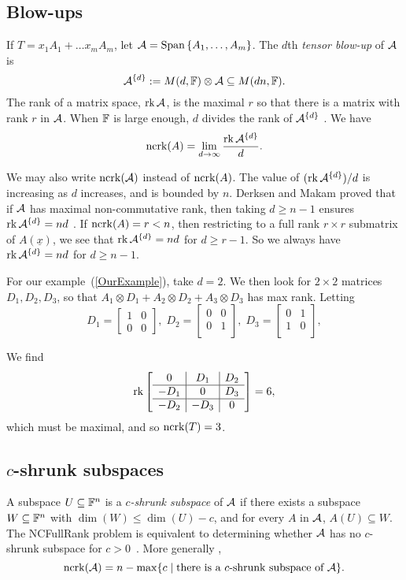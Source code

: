 \subsection{Blow-ups}
If $T=x_1A_1+\ldots x_mA_m$, let $\mathcal{A}=\operatorname{Span}{\{A_1,\ldots,A_m\}}$. The $d$th \emph{tensor blow-up} of $\mathcal{A}$ is $$\mathcal{A}^{\{d\}}:=M(d,{\mathbb F})\otimes\mathcal{A} \subseteq M(dn,{\mathbb F}).$$ 
The rank of a matrix space, $\operatorname{rk}{\mathcal{A}}$, is the maximal $r$ so that there is a matrix with rank $r$ in $\mathcal{A}$. When ${\mathbb F}$ is large enough, $d$ divides the rank of $\mathcal{A}^{\{d\}}$  \cite{IQS17}. We have $$\operatorname{ncrk}(A)=\lim_{d\rightarrow\infty}\frac{\operatorname{rk}{\mathcal{A}^{\{d\}}}}{d}.$$

We may also write $\operatorname{ncrk}(\mathcal{A})$ instead of $\operatorname{ncrk}(A)$. The value of $(\operatorname{rk}{\mathcal{A}^{\{d\}}})/d$ is increasing as $d$ increases, and is bounded by $n$. Derksen and Makam proved that if $\mathcal{A}$ has maximal non-commutative rank, then taking $d\geq n-1$ ensures $\operatorname{rk}{\mathcal{A}^{\{d\}}}=nd$ \cite{DM18}. 
If $\operatorname{ncrk}(A)=r<n$, then restricting to a full rank $r\times r$ submatrix of $A(\underline{x})$, we see
that $\operatorname{rk}{\mathcal{A}^{\{d\}}}=nd$ for $d\geq r-1$.
So we always have  $\operatorname{rk}{\mathcal{A}^{\{d\}}}=nd$ for $d\geq n-1$.


For our example~(\ref{OurExample}), take $d=2$. We then look for $2\times 2$ matrices $D_1,D_2,D_3$, so that $A_1\otimes D_1+A_2\otimes D_2+A_3\otimes D_3$ has max rank. Letting 
$$D_1=\begin{bmatrix}
1 & 0\\ 
0 & 0
\end{bmatrix}\!,\; D_2=\begin{bmatrix}
0 & 0\\ 
0 & 1 \\ 
\end{bmatrix}\!,\; D_3=\begin{bmatrix}
0 & 1 \\ 
1 & 0 \\ 
\end{bmatrix},$$

We find $$\operatorname{rk}{\left[
\begin{array}{c|c|c}
0 & D_1 & D_2\\
\hline
-D_1 & 0 & D_3 \\
\hline
-D_2 & -D_3 & 0
\end{array}
\right]}=6,$$
which must be maximal, and so $\operatorname{ncrk}(T)=3$.


\subsection{$c$-shrunk subspaces}
A subspace $U\subseteq {\mathbb F}^n$ is a \emph{$c$-shrunk subspace} of $\mathcal{A}$ if there exists a subspace $W\subseteq {\mathbb F}^n$ with $\dim(W)\leq\dim(U)-c$, and for every $A$ in $\mathcal{A}$, $A(U)\subseteq W$. The NCFullRank problem is equivalent to determining whether $\mathcal{A}$ has no $c$-shrunk subspace for $c>0$~\cite{Cohn95}. More generally \cite{FR04}, 
$$\operatorname{ncrk}(\mathcal{A})=n-\max\{c \mid \text{there is a $c$-shrunk subspace of $\mathcal{A}$}\}.$$

